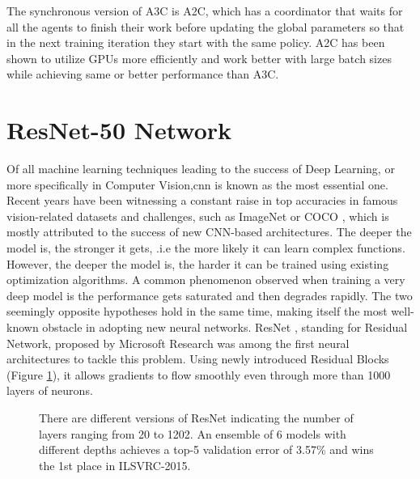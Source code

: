 The synchronous version of A3C is A2C, which has a coordinator that waits for all the agents to finish their work before updating the global parameters so that in the next training iteration they start with the same policy. A2C has been shown to utilize GPUs more efficiently and work better with large batch sizes while achieving same or better performance than A3C.

\section{ResNet-50 Network}
Of all machine learning techniques leading to the success of Deep Learning, or more specifically in Computer Vision,\gls{cnn} is known as the most essential one. Recent years have been witnessing a constant raise in top accuracies in famous vision-related datasets and challenges, such as ImageNet \cite{imagenet} or COCO \cite{coco}, which is mostly attributed to the success of new CNN-based architectures. The deeper the model is, the stronger it gets, .i.e the more likely it can learn complex functions. However, the deeper the model is, the harder it can be trained using existing optimization algorithms. A common phenomenon observed when training a very deep model is the performance gets saturated and then degrades rapidly. The two seemingly opposite hypotheses hold in the same time, making itself the most well-known obstacle in adopting new neural networks. ResNet \cite{resnet}, standing for Residual Network, proposed by Microsoft Research was among the first neural architectures to tackle this problem. Using newly introduced Residual Blocks (Figure \ref{fig:resnet}), it allows gradients to flow smoothly even through more than 1000 layers of neurons. 
\begin{figure}%
    \centering
    \qquad
    \caption{There are different versions of ResNet indicating the number of layers ranging from 20 to 1202. An ensemble of 6 models with different depths achieves a top-5 validation error of 3.57\% and wins the 1st place in ILSVRC-2015. }%
    \label{fig:resnet}%
\end{figure}

